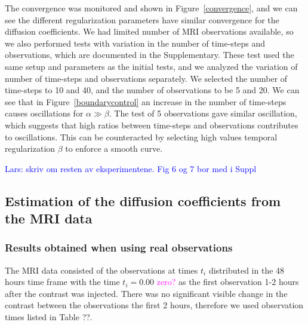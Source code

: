 \documentclass[12pt,a4paper]{article}
\newcommand{\kam}[1]{\textcolor{blue}{#1}}
\newcommand{\lars}[1]{\textcolor{magenta}{#1}}
\begin{document}
The convergence was monitored and shown in Figure~\ref{convergence}, and we can see the different regularization parameters have similar convergence for the diffusion coefficients. 
We had limited number of MRI observations available, so we also performed tests with variation in the number of time-steps and observations, which are documented in the Supplementary. These test used the same setup and parameters as the initial tests, and we analyzed the variation of number of time-steps and observations separately.
We selected the number of time-steps to 10 and 40, and the number of observations to be 5 and 20. We can see that in  Figure~\ref{boundarycontrol} an increase in the number of time-steps causes oscillations for $\alpha\gg\beta$. The test of 5 observations gave similar oscillation, which suggests that high ratios between time-steps and observations contributes to oscillations. This can be counteracted by selecting high values temporal regularization $\beta$ to enforce a smooth curve.  














\kam{Lars: skriv om resten av eksperimentene. Fig 6 og 7 bor med i Suppl}   

\subsection{Estimation of the diffusion coefficients from the MRI data} 

\subsubsection{Results obtained when using real observations}
The MRI data consisted of the observations at times $t_i$ distributed in the 48 hours time frame with the time $t_i=0.00$ \lars{zero?} as the first observation 1-2 hours after the contrast was injected. There was no significant visible change in the contrast between the observations the first 2 hours, therefore we used observation times listed in Table ??.
\end{document}
